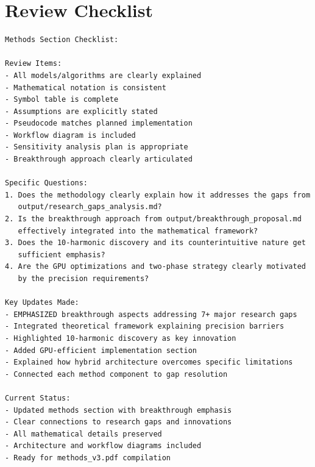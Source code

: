 \section*{Review Checklist}
\begin{small}
\begin{verbatim}
Methods Section Checklist:

Review Items:
- All models/algorithms are clearly explained
- Mathematical notation is consistent
- Symbol table is complete  
- Assumptions are explicitly stated
- Pseudocode matches planned implementation
- Workflow diagram is included
- Sensitivity analysis plan is appropriate
- Breakthrough approach clearly articulated

Specific Questions:
1. Does the methodology clearly explain how it addresses the gaps from
   output/research_gaps_analysis.md?
2. Is the breakthrough approach from output/breakthrough_proposal.md
   effectively integrated into the mathematical framework?
3. Does the 10-harmonic discovery and its counterintuitive nature get
   sufficient emphasis?
4. Are the GPU optimizations and two-phase strategy clearly motivated
   by the precision requirements?

Key Updates Made:
- EMPHASIZED breakthrough aspects addressing 7+ major research gaps
- Integrated theoretical framework explaining precision barriers
- Highlighted 10-harmonic discovery as key innovation
- Added GPU-efficient implementation section
- Explained how hybrid architecture overcomes specific limitations
- Connected each method component to gap resolution

Current Status:
- Updated methods section with breakthrough emphasis
- Clear connections to research gaps and innovations
- All mathematical details preserved
- Architecture and workflow diagrams included
- Ready for methods_v3.pdf compilation
\end{verbatim}
\end{small}